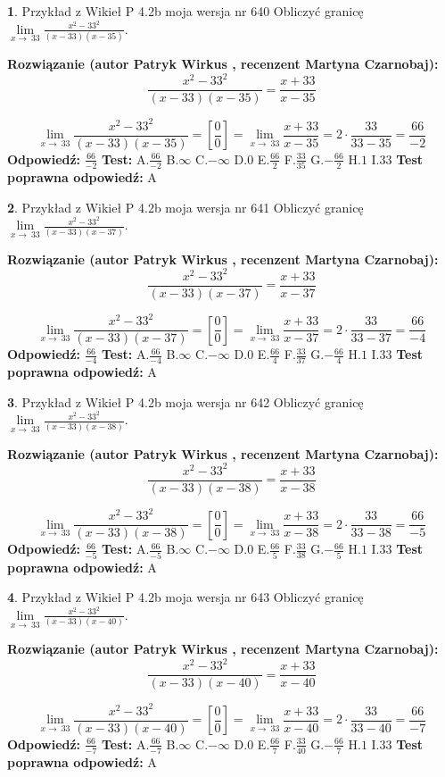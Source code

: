 \documentclass[12pt, a4paper]{article}
\theoremstyle{definition} %
\newtheorem{zad}{}
\newcommand{\zadStart}[1]{\begin{zad}#1\newline}
\newcommand{\zadStop}{\end{zad}}
\newcommand{\rozwStart}[2]{\noindent \textbf{Rozwiązanie (autor #1 , recenzent #2): }\newline}
\newcommand{\rozwStop}{\newline}
\newcommand{\odpStart}{\noindent \textbf{Odpowiedź:}\newline}
\newcommand{\odpStop}{\newline}
\newcommand{\testStart}{\noindent \textbf{Test:}\newline}
\newcommand{\testStop}{\newline}
\newcommand{\kluczStart}{\noindent \textbf{Test poprawna odpowiedź:}\newline}
\newcommand{\kluczStop}{\newline}
\begin{document}
\zadStart{Przykład z Wikieł P 4.2b moja wersja nr 640}
Obliczyć granicę $\lim\limits_{x\to\ 33}\frac{x^{2}-33^{2}}{(x-33)(x-35)}$.
\zadStop
\rozwStart{Patryk Wirkus}{Martyna Czarnobaj}
$$\frac{x^{2}-33^{2}}{(x-33)(x-35)}=\frac{x+33}{x-35}$$

$$\lim\limits_{x\to\ 33}\frac{x^{2}-33^{2}}{(x-33)(x-35)}=[\frac{0}{0}]=\lim\limits_{x\to\ 33}\frac{x+33}{x-35}=2 \cdot \frac{33}{33-35} = \frac{66}{-2}$$
\rozwStop
\odpStart
$\frac{66}{-2}$
\odpStop
\testStart
A.$\frac{66}{-2}$
B.$\infty$
C.$-\infty$
D.$0$
E.$\frac{66}{2}$
F.$\frac{33}{35}$
G.$-\frac{66}{2}$
H.$1$
I.$33$
\testStop
\kluczStart
A
\kluczStop



\zadStart{Przykład z Wikieł P 4.2b moja wersja nr 641}
Obliczyć granicę $\lim\limits_{x\to\ 33}\frac{x^{2}-33^{2}}{(x-33)(x-37)}$.
\zadStop
\rozwStart{Patryk Wirkus}{Martyna Czarnobaj}
$$\frac{x^{2}-33^{2}}{(x-33)(x-37)}=\frac{x+33}{x-37}$$

$$\lim\limits_{x\to\ 33}\frac{x^{2}-33^{2}}{(x-33)(x-37)}=[\frac{0}{0}]=\lim\limits_{x\to\ 33}\frac{x+33}{x-37}=2 \cdot \frac{33}{33-37} = \frac{66}{-4}$$
\rozwStop
\odpStart
$\frac{66}{-4}$
\odpStop
\testStart
A.$\frac{66}{-4}$
B.$\infty$
C.$-\infty$
D.$0$
E.$\frac{66}{4}$
F.$\frac{33}{37}$
G.$-\frac{66}{4}$
H.$1$
I.$33$
\testStop
\kluczStart
A
\kluczStop



\zadStart{Przykład z Wikieł P 4.2b moja wersja nr 642}
Obliczyć granicę $\lim\limits_{x\to\ 33}\frac{x^{2}-33^{2}}{(x-33)(x-38)}$.
\zadStop
\rozwStart{Patryk Wirkus}{Martyna Czarnobaj}
$$\frac{x^{2}-33^{2}}{(x-33)(x-38)}=\frac{x+33}{x-38}$$

$$\lim\limits_{x\to\ 33}\frac{x^{2}-33^{2}}{(x-33)(x-38)}=[\frac{0}{0}]=\lim\limits_{x\to\ 33}\frac{x+33}{x-38}=2 \cdot \frac{33}{33-38} = \frac{66}{-5}$$
\rozwStop
\odpStart
$\frac{66}{-5}$
\odpStop
\testStart
A.$\frac{66}{-5}$
B.$\infty$
C.$-\infty$
D.$0$
E.$\frac{66}{5}$
F.$\frac{33}{38}$
G.$-\frac{66}{5}$
H.$1$
I.$33$
\testStop
\kluczStart
A
\kluczStop



\zadStart{Przykład z Wikieł P 4.2b moja wersja nr 643}
Obliczyć granicę $\lim\limits_{x\to\ 33}\frac{x^{2}-33^{2}}{(x-33)(x-40)}$.
\zadStop
\rozwStart{Patryk Wirkus}{Martyna Czarnobaj}
$$\frac{x^{2}-33^{2}}{(x-33)(x-40)}=\frac{x+33}{x-40}$$

$$\lim\limits_{x\to\ 33}\frac{x^{2}-33^{2}}{(x-33)(x-40)}=[\frac{0}{0}]=\lim\limits_{x\to\ 33}\frac{x+33}{x-40}=2 \cdot \frac{33}{33-40} = \frac{66}{-7}$$
\rozwStop
\odpStart
$\frac{66}{-7}$
\odpStop
\testStart
A.$\frac{66}{-7}$
B.$\infty$
C.$-\infty$
D.$0$
E.$\frac{66}{7}$
F.$\frac{33}{40}$
G.$-\frac{66}{7}$
H.$1$
I.$33$
\testStop
\kluczStart
A
\kluczStop
\end{document}
